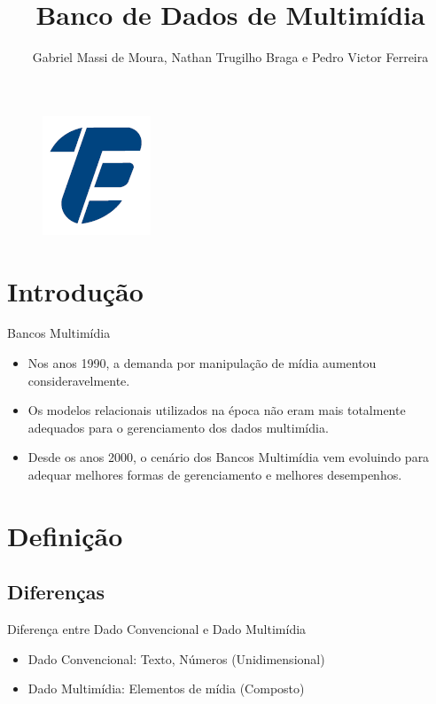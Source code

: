 \documentclass{beamer}
\author{Gabriel Massi de Moura, Nathan Trugilho Braga e Pedro Victor Ferreira}
\title{Banco de Dados de Multimídia}
\institute{CEFET-RJ}
\begin{document}
\begin{frame}
    \titlepage
    \begin{figure}[htpb]
        \begin{center}
            \includegraphics[width=0.2\linewidth]{pic/logo.PNG}
        \end{center}
    \end{figure}
\end{frame}

\begin{frame}
    \tableofcontents[sectionstyle=show,subsectionstyle=show/shaded/hide,subsubsectionstyle=show/shaded/hide]
\end{frame}


\section{Introdução}

    \begin{frame}{Bancos Multimídia}
        \begin{itemize}
           \item  Nos anos 1990, a demanda por manipulação de mídia aumentou consideravelmente.
            \item Os modelos relacionais utilizados na época não eram mais totalmente adequados para o gerenciamento dos dados multimídia.
            \item Desde os anos 2000, o cenário dos Bancos Multimídia vem evoluindo para adequar melhores formas de gerenciamento e melhores desempenhos.
        \end{itemize}
    \end{frame}

\section{Definição}
    
    \subsection{Diferenças}
    
    \begin{frame}{Diferença entre Dado Convencional e Dado Multimídia}
        \begin{itemize}
            \item Dado Convencional: Texto, Números (Unidimensional)
            \item Dado Multimídia: Elementos de mídia (Composto)
        \end{itemize}
    \end{frame}
    
\end{document}
